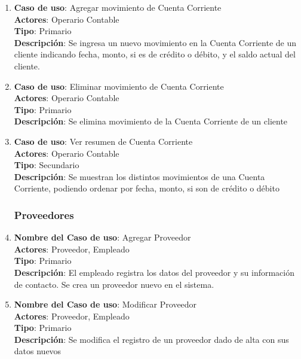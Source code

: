\documentclass[12pt]{extarticle}
\begin{document}
\begin{spacing}{1.2}
\begin{enumerate}
            \item 	\textbf{Caso de uso}: Agregar movimiento de Cuenta Corriente\\
                    \textbf{Actores}: Operario Contable\\
                    \textbf{Tipo}: Primario\\
                    \textbf{Descripción}: Se ingresa un nuevo movimiento en la Cuenta Corriente de un cliente indicando fecha, monto, si es de crédito o débito, y el saldo actual del cliente.

            \item   \textbf{Caso de uso}: Eliminar movimiento de Cuenta Corriente\\
                    \textbf{Actores}: Operario Contable\\
                    \textbf{Tipo}: Primario\\
                    \textbf{Descripción}: Se elimina movimiento de la Cuenta Corriente de un cliente

            \item   \textbf{Caso de uso}: Ver resumen de Cuenta Corriente\\
                    \textbf{Actores}: Operario Contable\\
                    \textbf{Tipo}: Secundario\\
                    \textbf{Descripción}: Se muestran los distintos movimientos de una Cuenta Corriente, podiendo ordenar por fecha, monto, si son de crédito o débito



            \subsubsection{Proveedores}



            \item 	\textbf{Nombre del Caso de uso}: Agregar Proveedor\\
                    \textbf{Actores}: Proveedor, Empleado\\
                    \textbf{Tipo}: Primario\\
                    \textbf{Descripción}: El empleado registra los datos del proveedor y su información de contacto. Se crea un proveedor nuevo en el sistema.
            
            \item 	\textbf{Nombre del Caso de uso}: Modificar Proveedor\\
                    \textbf{Actores}: Proveedor, Empleado\\
                    \textbf{Tipo}: Primario\\
                    \textbf{Descripción}: Se modifica el registro de un proveedor dado de alta con sus datos nuevos
            

\end{enumerate}
\end{spacing}
\end{document}
